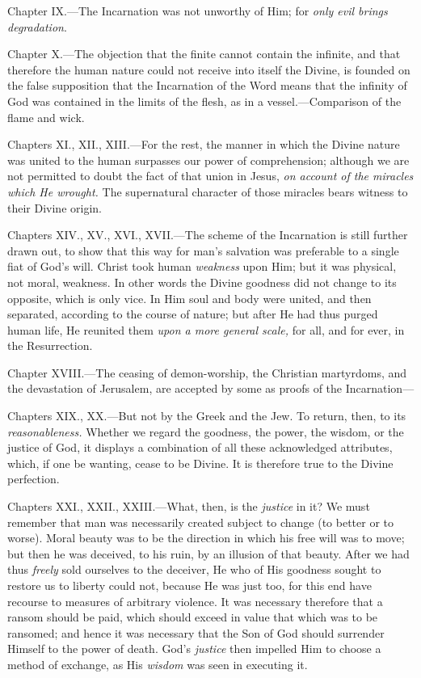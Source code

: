 Chapter IX.—The Incarnation was not unworthy of Him; for \emph{only evil brings degradation}.

Chapter X.—The objection that the finite cannot contain the infinite, and that therefore the human nature could not receive into itself the Divine, is founded on the false supposition that the Incarnation of the Word means that the infinity of God was contained in the limits of the flesh, as in a vessel.—Comparison of the flame and wick.

Chapters XI., XII., XIII.—For the rest, the manner in which the Divine nature was united to the human surpasses our power of comprehension; although we are not permitted to doubt the fact of that union in Jesus, \emph{on account of the miracles which He wrought.} The supernatural character of those miracles bears witness to their Divine origin.

Chapters XIV., XV., XVI., XVII.—The scheme of the Incarnation is still further drawn out, to show that this way for man’s salvation was preferable to a single fiat of God’s will. Christ took human \emph{weakness} upon Him; but it was physical, not moral, weakness. In other words the Divine goodness did not change to its opposite, which is only vice. In Him soul and body were united, and then separated, according to the course of nature; but after He had thus purged human life, He reunited them \emph{upon a more general scale,} for all, and for ever, in the Resurrection.

Chapter XVIII.—The ceasing of demon-worship, the Christian martyrdoms, and the devastation of Jerusalem, are accepted by some as proofs of the Incarnation—

Chapters XIX., XX.—But not by the Greek and the Jew. To return, then, to its \emph{reasonableness.} Whether we regard the goodness, the power, the wisdom, or the justice of God, it displays a combination of all these acknowledged attributes, which, if one be wanting, cease to be Divine. It is therefore true to the Divine perfection.

Chapters XXI., XXII., XXIII.—What, then, is the \emph{justice} in it? We must remember that man was necessarily created subject to change (to better or to worse). Moral beauty was to be the direction in which his free will was to move; but then he was deceived, to his ruin, by an illusion of that beauty. After we had thus \emph{freely} sold ourselves to the deceiver, He who of His goodness sought to restore us to liberty could not, because He was just too, for this end have recourse to measures of arbitrary violence. It was necessary therefore that a ransom should be paid, which should exceed in value that which was to be ransomed; and hence it was necessary that the Son of God should surrender Himself to the power of death. God’s \emph{justice} then impelled Him to choose a method of exchange, as His \emph{wisdom} was seen in executing it.

